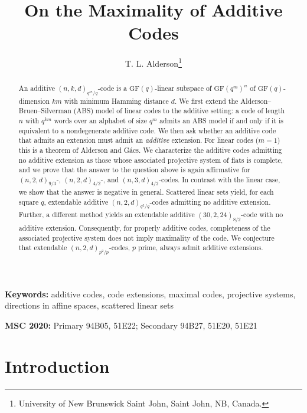 \documentclass[12pt]{article}
\theoremstyle{definition}
\numberwithin{equation}{section}
\newcommand{\GF}[1]{\mathrm{GF}(#1)}
\begin{document}
\title{On the Maximality of Additive Codes}

\author{T. L. Alderson\thanks{University of New Brunswick Saint John, Saint John, NB, Canada.}}

\date{}

\maketitle

\begin{abstract}
An additive $(n,k,d)_{q^m/q}$-code is a $\GF{q}$-linear subspace of $\GF{q^m}^n$ of $\GF{q}$-dimension $km$ with minimum Hamming distance $d$. We first extend the Alderson--Bruen--Silverman (ABS) model of linear codes to the additive setting: a code of length $n$ with $q^{km}$ words over an alphabet of size $q^m$ admits an ABS model if and only if it is equivalent to a nondegenerate additive code.  We then ask whether an additive code that admits an extension must admit an \emph{additive} extension.  For linear codes ($m=1$) this is a theorem of Alderson and G\'acs.  We characterize the additive codes admitting no additive extension as those whose associated projective system of flats is complete, and we prove that the answer to the question above is again affirmative for $(n,2,d)_{9/3}$-, $(n,2,d)_{4/2}$-, and $(n,3,d)_{4/2}$-codes.  In contrast with the linear case, we show that the answer is negative in general.  Scattered linear sets yield, for each square $q$, extendable additive $(n,2,d)_{q^2/q}$-codes admitting no additive extension.  Further, a different method yields an extendable additive $(30,2,24)_{8/2}$-code with no additive extension.  Consequently, for properly additive codes, completeness of the associated projective system does not imply maximality of the code.  We conjecture that extendable $(n,2,d)_{p^2/p}$-codes, $p$ prime, always admit additive extensions.
\end{abstract}

\medskip
\noindent\textbf{Keywords:} additive codes, code extensions, maximal codes, projective systems, directions in affine spaces, scattered linear sets

\smallskip
\noindent\textbf{MSC 2020:} Primary 94B05, 51E22; Secondary 94B27, 51E20, 51E21


\section{Introduction}\label{sec:intro}
\end{document}
